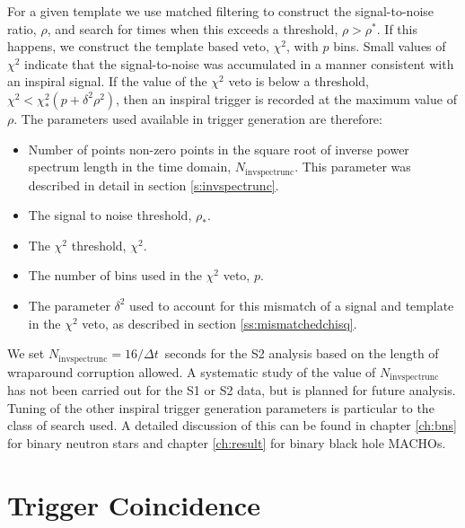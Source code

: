 For a given template we use matched filtering to construct the signal-to-noise
ratio, $\rho$, and search for times when this exceeds a threshold, $\rho >
\rho^\ast$. If this happens, we construct the template based veto, $\chi^2$,
with $p$ bins. Small values of $\chi^2$ indicate that the signal-to-noise was
accumulated in a manner consistent with an inspiral signal. If the value of
the $\chi^2$ veto is below a threshold, $\chi^2 < \chi^2_\ast (p + \delta^2
\rho^2)$, then an inspiral trigger is recorded at the maximum value of $\rho$.
The parameters used available in trigger generation are therefore:
\begin{itemize}
\item Number of points non-zero points in the square root of inverse power
spectrum length in the time domain, $N_\mathrm{invspectrunc}$. This
parameter was described in detail in section \ref{s:invspectrunc}.

\item The signal to noise threshold, $\rho_\ast$.

\item The $\chi^2$ threshold, $\chi^2$.

\item The number of bins used in the $\chi^2$ veto, $p$.

\item The parameter $\delta^2$ used to account for this mismatch of a signal
and template in the $\chi^2$ veto, as described in section
\ref{ss:mismatchedchisq}.
\end{itemize}
We set $N_\mathrm{invspectrunc} = 16 / \Delta t$~seconds for the S2 analysis
based on the length of wraparound corruption allowed. A systematic study of
the value of $N_\mathrm{invspectrunc}$ has not been carried out for the S1
or S2 data, but is planned for future analysis. Tuning of the other inspiral
trigger generation parameters is particular to the class of search used. A
detailed discussion of this can be found in chapter \ref{ch:bns} for binary
neutron stars and chapter \ref{ch:result} for binary black hole MACHOs.

\section{Trigger Coincidence}
\label{s:coincidence}

